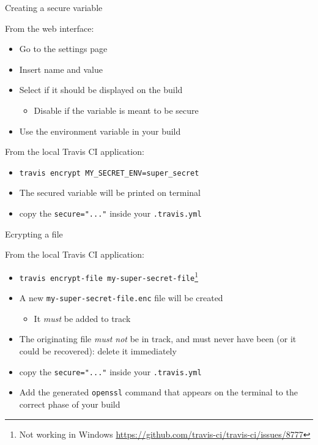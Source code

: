 \documentclass[presentation]{beamer}
\begin{document}
\begin{frame}{Creating a secure variable}
    \begin{block}{From the web interface:}
        \begin{itemize}
            \item Go to the settings page
            \item Insert name and value
            \item Select if it should be displayed on the build
            \begin{itemize}
                \item Disable if the variable is meant to be secure
            \end{itemize}
            \item Use the environment variable in your build
        \end{itemize}
    \end{block}
    \begin{block}{From the local Travis CI application:}
        \begin{itemize}
            \item \texttt{travis encrypt MY\_SECRET\_ENV=super\_secret}
            \item The secured variable will be printed on terminal
            \item copy the \texttt{secure="..."} inside your \texttt{.travis.yml}
        \end{itemize}
    \end{block}
\end{frame}

\begin{frame}{Ecrypting a file}
    \begin{block}{From the local Travis CI application:}
        \begin{itemize}
            \item \texttt{travis encrypt-file my-super-secret-file}\footnote{Not working in Windows \url{https://github.com/travis-ci/travis-ci/issues/8777}}
            \item A new \texttt{my-super-secret-file.enc} file will be created
            \begin{itemize}
                \item It \textit{must} be added to track
            \end{itemize}
            \item The originating file \textit{must not} be in track, and must never have been (or it could be recovered): delete it immediately
            \item copy the \texttt{secure="..."} inside your \texttt{.travis.yml}
            \item Add the generated \texttt{openssl} command that appears on the terminal to the correct phase of your build
        \end{itemize}
    \end{block}
\end{frame}
\end{document}
